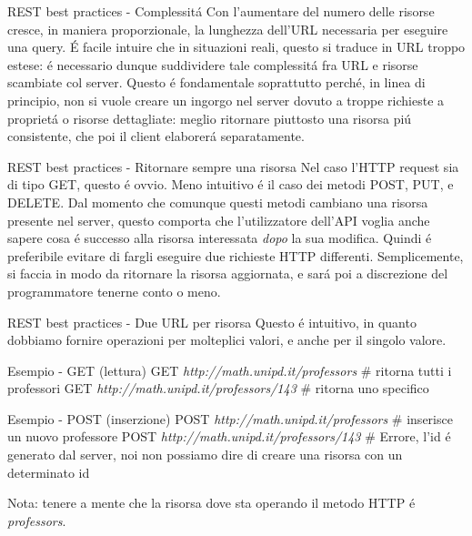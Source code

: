 \documentclass{beamer}
\begin{document}
\begin{frame}{REST best practices - Complessit\'a}
Con l'aumentare del numero delle risorse cresce, in maniera proporzionale, la lunghezza dell'URL necessaria per eseguire una
query. \'E facile intuire che in situazioni reali, questo si traduce in URL troppo estese: \'e necessario dunque suddividere tale
complessit\'a fra URL e risorse scambiate col server.
\newline
Questo \'e fondamentale soprattutto perch\'e, in linea di principio, non si vuole creare un ingorgo nel server dovuto a troppe
richieste a propriet\'a o risorse dettagliate: meglio ritornare piuttosto una risorsa pi\'u consistente, che poi il client elaborer\'a
separatamente.
\end{frame}


\begin{frame}{REST best practices - Ritornare sempre una risorsa}
Nel caso l'HTTP request sia di tipo GET, questo \'e ovvio. Meno intuitivo \'e il caso dei metodi POST, PUT, e DELETE. Dal momento
che comunque questi metodi cambiano una risorsa presente nel server, questo comporta che l'utilizzatore dell'API voglia anche
sapere cosa \'e successo alla risorsa interessata \emph{dopo} la sua modifica. Quindi \'e preferibile evitare di fargli eseguire
due richieste HTTP differenti. Semplicemente, si faccia in modo da ritornare la risorsa aggiornata, e sar\'a poi a discrezione
del programmatore tenerne conto o meno.
\end{frame}


\begin{frame}{REST best practices - Due URL per risorsa}
Questo \'e intuitivo, in quanto dobbiamo fornire operazioni per molteplici valori, e anche per il singolo valore.
\begin{exampleblock}{Esempio - GET (lettura)}
GET \emph{http://math.unipd.it/professors} \# ritorna tutti i professori
\newline
GET \emph{http://math.unipd.it/professors/143} \# ritorna uno specifico
\end{exampleblock}
\begin{exampleblock}{Esempio - POST (inserzione)}
POST \emph{http://math.unipd.it/professors} \# inserisce un nuovo professore
\newline
POST \emph{http://math.unipd.it/professors/143} \# Errore, l'id \'e generato dal server, noi non possiamo dire di creare
una risorsa con un determinato id
\end{exampleblock}
Nota: tenere a mente che la risorsa dove sta operando il metodo HTTP \'e \emph{professors}.

\end{frame}
\end{document}
